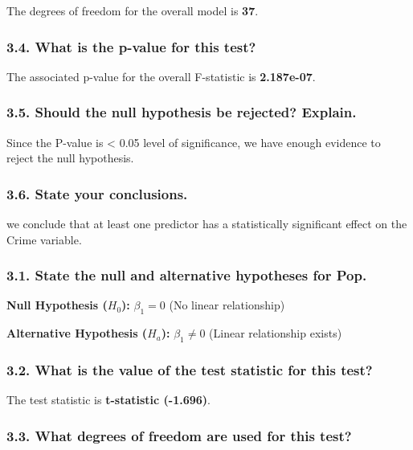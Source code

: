 \documentclass[
]{article}
\begin{document}
The degrees of freedom for the overall model is \textbf{37}.

\subsubsection{3.4. What is the p-value for this
test?}\label{what-is-the-p-value-for-this-test}

The associated p-value for the overall F-statistic is
\textbf{2.187e-07}.

\subsubsection{3.5. Should the null hypothesis be rejected?
Explain.}\label{should-the-null-hypothesis-be-rejected-explain.}

Since the P-value is \textless{} 0.05 level of significance, we have
enough evidence to reject the null hypothesis.

\subsubsection{3.6. State your
conclusions.}\label{state-your-conclusions.}

we conclude that at least one predictor has a statistically significant
effect on the Crime variable.

\subsubsection{3.1. State the null and alternative hypotheses for
Pop.}\label{state-the-null-and-alternative-hypotheses-for-pop.}

\textbf{Null Hypothesis (\(H_0\)):} \(\beta_1 = 0\) (No linear
relationship)

\textbf{Alternative Hypothesis (\(H_a\)):} \(\beta_1 \neq 0\) (Linear
relationship exists)

\subsubsection{3.2. What is the value of the test statistic for this
test?}\label{what-is-the-value-of-the-test-statistic-for-this-test-1}

The test statistic is \textbf{t-statistic (-1.696)}.

\subsubsection{3.3. What degrees of freedom are used for this
test?}\label{what-degrees-of-freedom-are-used-for-this-test-1}
\end{document}
